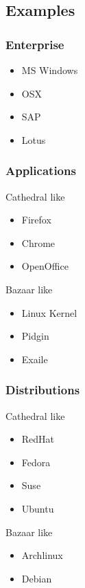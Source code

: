 \documentclass[hyperref={pdfpagelabels=false},xcolor=pst,pdf,fragile]{beamer}
\begin{document}
\subsection{Examples}

\begin{frame}
  \frametitle{Enterprise}

  \begin{itemize}
	\item MS Windows
	\item OSX
	\item SAP
	\item Lotus
  \end{itemize}

\end{frame}

\begin{frame}
  \frametitle{Applications}

  \begin{block}{Cathedral like}
	\begin{itemize}
	  \item Firefox
	  \item Chrome
	  \item OpenOffice
	\end{itemize}
  \end{block}

  \begin{block}{Bazaar like}
	\begin{itemize}
	  \item Linux Kernel
	  \item Pidgin
	  \item Exaile
	\end{itemize}
  \end{block}

\end{frame}

\begin{frame}
  \frametitle{Distributions}

  \begin{block}{Cathedral like}
	\begin{itemize}
	  \item RedHat
	  \item Fedora
	  \item Suse
	  \item Ubuntu
	\end{itemize}
  \end{block}

  \begin{block}{Bazaar like}
	\begin{itemize}
	  \item Archlinux
	  \item Debian
	\end{itemize}
  \end{block}

\end{frame}
\end{document}
